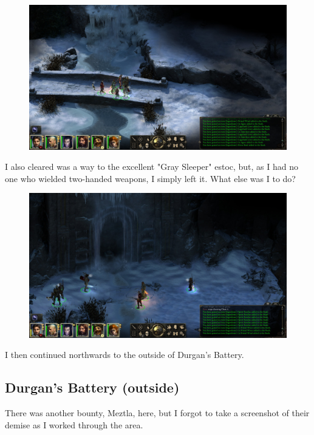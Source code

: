 \documentclass{article}
\begin{document}
\begin{figure}
\includegraphics[scale=0.33]{files/blog/2019_08_17_poe_potd_wmpt1/2019_08_17_longwatch_falls_2.jpg}
\end{figure}

I also cleared was a way to the excellent "Gray Sleeper" estoc, but, as I had no one who wielded two-handed weapons, I simply left it.  What else was I to do?

\begin{figure}
\includegraphics[scale=0.33]{files/blog/2019_08_17_poe_potd_wmpt1/2019_08_17_longwatch_falls_3.jpg}
\end{figure}

I then continued northwards to the outside of Durgan's Battery.

\subsection{Durgan's Battery (outside)}

There was another bounty, Meztla, here, but I forgot to take a screenshot of their demise as I worked through the area.
\end{document}
